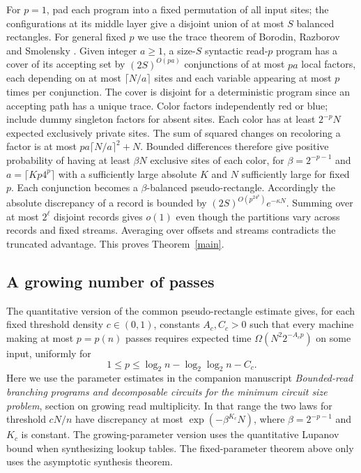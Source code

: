 \documentclass[11pt]{article}
\begin{document}
For $p=1$, pad each program into a fixed permutation of all input sites; the configurations at its middle layer give a disjoint union of at most $S$ balanced rectangles. For general fixed $p$ we use the trace theorem of Borodin, Razborov and Smolensky \cite[Thm.~1]{brs}. Given integer $a\ge1$, a size-$S$ syntactic read-$p$ program has a cover of its accepting set by $(2S)^{O(pa)}$ conjunctions of at most $pa$ local factors, each depending on at most $\lceil N/a\rceil$ sites and each variable appearing at most $p$ times per conjunction. The cover is disjoint for a deterministic program since an accepting path has a unique trace. Color factors independently red or blue; include dummy singleton factors for absent sites. Each color has at least $2^{-p}N$ expected exclusively private sites. The sum of squared changes on recoloring a factor is at most $pa\lceil N/a\rceil^2+N$. Bounded differences therefore give positive probability of having at least $\beta N$ exclusive sites of each color, for $\beta=2^{-p-1}$ and $a=\lceil Kp4^p\rceil$ with a sufficiently large absolute $K$ and $N$ sufficiently large for fixed $p$. Each conjunction becomes a $\beta$-balanced pseudo-rectangle. Accordingly the absolute discrepancy of a record is bounded by $(2S)^{O(p^24^p)} e^{-\kappa N}$. Summing over at most $2^\ell$ disjoint records gives $o(1)$ even though the partitions vary across records and fixed streams. Averaging over offsets and streams contradicts the truncated advantage. This proves Theorem~\ref{main}.

\subsection{A growing number of passes}
The quantitative version of the common pseudo-rectangle estimate gives,
for each fixed threshold density $c\in(0,1)$, constants $A_c,C_c>0$
such that every machine making at most $p=p(n)$ passes requires expected
time $\Omega(N^2 2^{-A_c p})$ on some input, uniformly for
\[
 1\le p\le\log_2 n-\log_2\log_2 n-C_c .
\]
Here we use the parameter estimates in the companion manuscript
\emph{Bounded-read branching programs and decomposable circuits for the minimum circuit size problem},
section on growing read multiplicity. In that range the two laws for
threshold $cN/n$ have discrepancy at most
$\exp(-\beta^{K_c}N)$, where $\beta=2^{-p-1}$ and $K_c$ is constant.
The growing-parameter version uses the quantitative Lupanov bound
when synthesizing lookup tables. The fixed-parameter theorem above only
uses the asymptotic synthesis theorem.
\end{document}
